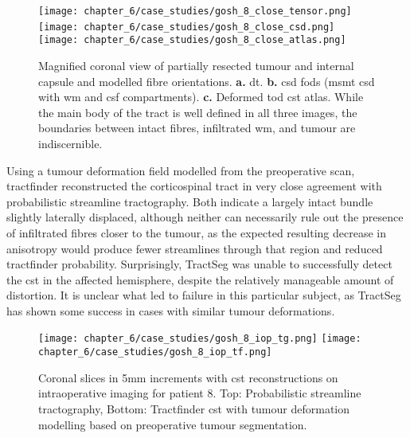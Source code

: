 \begin{figure}
  \centering
  \texttt{[image: chapter\_6/case\_studies/gosh\_8\_close\_tensor.png]}\,%
  \texttt{[image: chapter\_6/case\_studies/gosh\_8\_close\_csd.png]}\,%
  \texttt{[image: chapter\_6/case\_studies/gosh\_8\_close\_atlas.png]}
  \caption{Magnified coronal view of partially resected tumour and internal capsule and modelled fibre orientations. \textbf{a.} \gls{dt}. \textbf{b.} \gls{csd} \glspl{fod} (\gls{msmt} \gls{csd} with \gls{wm} and \gls{csf} compartments). \textbf{c.} Deformed \gls{tod} \gls{cst} atlas. While the main body of the tract is well defined in all three images, the boundaries between intact fibres, infiltrated \gls{wm}, and tumour are indiscernible.}
  \label{fig:8i_fod}
\end{figure}

Using a tumour deformation field modelled from the preoperative scan, tractfinder reconstructed the corticospinal tract in very close agreement with probabilistic streamline tractography.
Both indicate a largely intact bundle slightly laterally displaced, although neither can necessarily rule out the presence of infiltrated fibres closer to the tumour, as the expected resulting decrease in anisotropy would produce fewer streamlines through that region and reduced tractfinder probability.
Surprisingly, TractSeg was unable to successfully detect the \gls{cst} in the affected hemisphere, despite the relatively manageable amount of distortion.
It is unclear what led to failure in this particular subject, as TractSeg has shown some success in cases with similar tumour deformations\autocite{Moshe2022}.

\begin{figure}
  \texttt{[image: chapter\_6/case\_studies/gosh\_8\_iop\_tg.png]}
  \texttt{[image: chapter\_6/case\_studies/gosh\_8\_iop\_tf.png]}
  \caption{Coronal slices in 5mm increments with \gls{cst} reconstructions on intraoperative imaging for patient 8. Top: Probabilistic streamline tractography, Bottom: Tractfinder \gls{cst} with tumour deformation modelling based on preoperative tumour segmentation.}
  \label{fig:8i_tf}
\end{figure}
